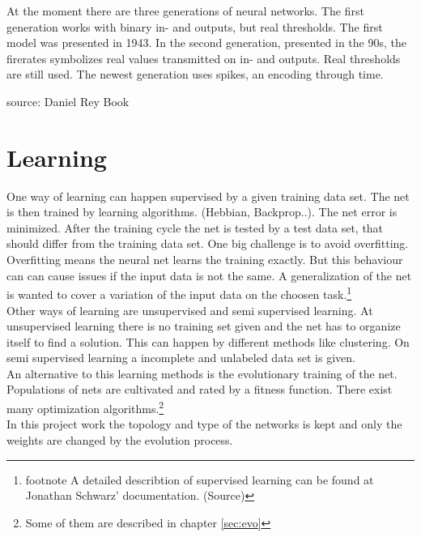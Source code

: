 \documentclass[10pt,a4paper,DIV=11]{scrreprt}
\begin{document}
At the moment there are three generations of neural networks. 
The first generation works with binary in- and outputs, but real thresholds. The first model was presented in 1943.
In the second generation, presented in the 90s, the firerates symbolizes real values transmitted on in- and outputs. Real thresholds are still used.
The newest generation uses spikes, an encoding through time.


source: Daniel Rey Book


\section{Learning}
One way of learning can happen supervised by a given training data set. The net is then trained by learning algorithms. (Hebbian, Backprop..). The net error is minimized. After the training cycle the net is tested by a test data set, that should differ from the training data set. One big challenge is to avoid overfitting. Overfitting means the neural net learns the training exactly. But this behaviour can can cause issues if the input data is not the same. A generalization of the net is wanted to cover a variation of the input data on the choosen task.\footnote{footnote A detailed describtion of supervised learning can be found at Jonathan Schwarz' documentation. (Source)} \\

Other ways of learning are unsupervised and semi supervised learning. At unsupervised learning there is no training set given and the net has to organize itself to find a solution. This can happen by different methods like clustering. On semi supervised learning a incomplete and unlabeled data set is given. \\

An alternative to this learning methods is the evolutionary training of the net. Populations of nets are cultivated and rated by a fitness function. There exist many optimization algorithms.\footnote{Some of them are described in chapter \ref{sec:evo}} \\

In this project work the topology and type of the networks is kept and only the weights are changed by the evolution process.
\end{document}
